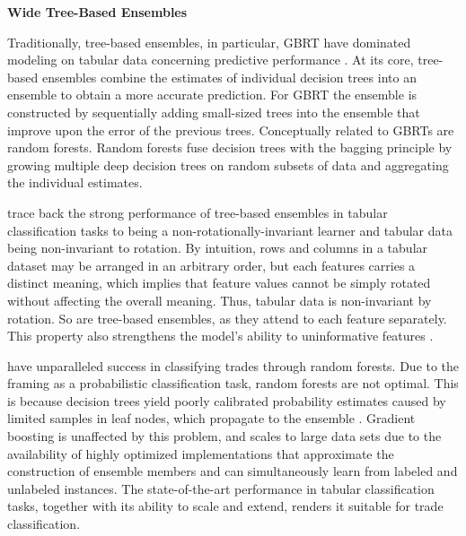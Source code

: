 \textbf{Wide Tree-Based Ensembles}

Traditionally, tree-based ensembles, in particular, \gls{GBRT} have dominated modeling on tabular data concerning predictive performance \autocites[][512]{grinsztajnWhyTreebasedModels2022}[][23935]{kadraWelltunedSimpleNets2021}[][18939]{gorishniyRevisitingDeepLearning2021}. At its core, tree-based ensembles combine the estimates of individual decision trees into an ensemble to obtain a more accurate prediction. For \gls{GBRT} \autocite[][1193]{friedmanGreedyFunctionApproximation2001} the ensemble is constructed by sequentially adding small-sized trees into the ensemble that improve upon the error of the previous trees. Conceptually related to \glspl{GBRT} are random forests. Random forests \autocite[][6]{breimanRandomForests2001} fuse decision trees with the bagging principle \autocite[][123]{breimanBaggingPredictors1996} by growing multiple deep decision trees on random subsets of data and aggregating the individual estimates. 

\textcite[][513--515]{grinsztajnWhyTreebasedModels2022} trace back the strong performance of tree-based ensembles in tabular classification tasks to being a non-rotationally-invariant learner and tabular data being non-invariant to rotation. By intuition, rows and columns in a tabular dataset may be arranged in an arbitrary order, but each features carries a distinct meaning, which implies that feature values cannot be simply rotated without affecting the overall meaning. Thus, tabular data is non-invariant by rotation. So are tree-based ensembles, as they attend to each feature separately. This property also strengthens the model's ability to uninformative features \autocite[][513--515]{grinsztajnWhyTreebasedModels2022}.

\textcite[][13--14]{ronenMachineLearningTrade2022} have unparalleled success in classifying trades through random forests. Due to the framing as a probabilistic classification task, random forests are not optimal. This is because decision trees yield poorly calibrated probability estimates caused by limited samples in leaf nodes, which propagate to the ensemble \autocite[][356--360]{tanhaSemisupervisedSelftrainingDecision2017}. Gradient boosting is unaffected by this problem, and scales to large data sets due to the availability of highly optimized implementations that approximate the construction of ensemble members and can simultaneously learn from labeled and unlabeled instances. The state-of-the-art performance in tabular classification tasks, together with its ability to scale and extend, renders it suitable for trade classification.


